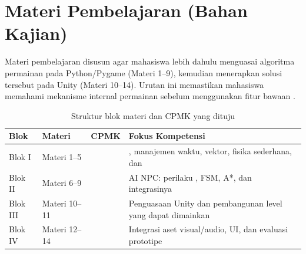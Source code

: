 
\section{Materi Pembelajaran (Bahan Kajian)}

Materi pembelajaran disusun agar mahasiswa lebih dahulu menguasai algoritma
permainan pada Python/Pygame (Materi 1--9), kemudian menerapkan solusi
 tersebut pada  Unity (Materi 10--14).
Urutan ini memastikan mahasiswa memahami mekanisme internal permainan sebelum
menggunakan fitur bawaan .

\begin{table}[htbp]
\centering
\caption{Struktur blok materi dan CPMK yang dituju}
\label{tab:blok-materi}
\begin{tabularx}{\textwidth}{@{}C{2.6cm} C{3.2cm} L{4.2cm} Y@{}}
\toprule
\headrow \textbf{Blok} & \textbf{Materi} & \textbf{CPMK} & \textbf{Fokus Kompetensi} \\
\midrule
Blok I  & Materi 1--5 &  & , manajemen waktu, vektor, fisika sederhana, dan  \\
Blok II & Materi 6--9 &  & AI NPC: perilaku , FSM,  A*, dan integrasinya \\
Blok III & Materi 10--11 &  & Penguasaan Unity dan pembangunan level yang dapat dimainkan \\
Blok IV & Materi 12--14 &  & Integrasi aset visual/audio, UI, dan evaluasi prototipe \\
\bottomrule
\end{tabularx}
\end{table}

